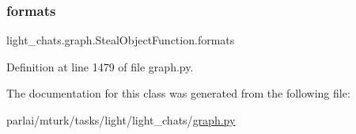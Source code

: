 \subsubsection{\texorpdfstring{formats}{formats}}
{\footnotesize\ttfamily light\+\_\+chats.\+graph.\+Steal\+Object\+Function.\+formats}



Definition at line 1479 of file graph.\+py.



The documentation for this class was generated from the following file\+:\begin{DoxyCompactItemize}
\item 
parlai/mturk/tasks/light/light\+\_\+chats/\hyperlink{parlai_2mturk_2tasks_2light_2light__chats_2graph_8py}{graph.\+py}\end{DoxyCompactItemize}
